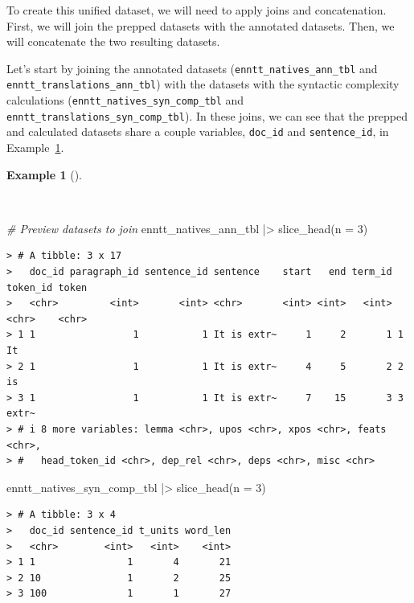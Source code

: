 \documentclass[
  letterpaper,
  DIV=11,
  numbers=noendperiod]{scrreprt}
\newenvironment{Shaded}{\begin{snugshade}}{\end{snugshade}}
\newcommand{\AttributeTok}[1]{\textcolor[rgb]{0.00,0.00,0.00}{#1}}
\newcommand{\CommentTok}[1]{\textcolor[rgb]{0.00,0.00,0.00}{\textit{#1}}}
\newcommand{\DecValTok}[1]{\textcolor[rgb]{0.00,0.00,0.00}{#1}}
\newcommand{\FunctionTok}[1]{\textcolor[rgb]{0.00,0.00,0.00}{#1}}
\newcommand{\NormalTok}[1]{\textcolor[rgb]{0.00,0.00,0.00}{#1}}
\newcommand{\SpecialCharTok}[1]{\textcolor[rgb]{0.00,0.00,0.00}{#1}}
\theoremstyle{definition}
\newtheorem{example}{Example}[chapter]
\theoremstyle{remark}
\begin{document}
To create this unified dataset, we will need to apply joins and
concatenation. First, we will join the prepped datasets with the
annotated datasets. Then, we will concatenate the two resulting
datasets.

Let's start by joining the annotated datasets
(\texttt{enntt\_natives\_ann\_tbl} and
\texttt{enntt\_translations\_ann\_tbl}) with the datasets with the
syntactic complexity calculations
(\texttt{enntt\_natives\_syn\_comp\_tbl} and
\texttt{enntt\_translations\_syn\_comp\_tbl}). In these joins, we can
see that the prepped and calculated datasets share a couple variables,
\texttt{doc\_id} and \texttt{sentence\_id}, in
Example~\ref{exm-td-merging-join-prepped-syn-comp}.

\begin{example}[]\protect\hypertarget{exm-td-merging-join-prepped-syn-comp}{}\label{exm-td-merging-join-prepped-syn-comp}

~

\begin{Shaded}
\begin{Highlighting}[]
\CommentTok{\# Preview datasets to join}
\NormalTok{enntt\_natives\_ann\_tbl }\SpecialCharTok{|\textgreater{}}
  \FunctionTok{slice\_head}\NormalTok{(}\AttributeTok{n =} \DecValTok{3}\NormalTok{)}
\end{Highlighting}
\end{Shaded}

\begin{verbatim}
> # A tibble: 3 x 17
>   doc_id paragraph_id sentence_id sentence    start   end term_id token_id token
>   <chr>         <int>       <int> <chr>       <int> <int>   <int> <chr>    <chr>
> 1 1                 1           1 It is extr~     1     2       1 1        It   
> 2 1                 1           1 It is extr~     4     5       2 2        is   
> 3 1                 1           1 It is extr~     7    15       3 3        extr~
> # i 8 more variables: lemma <chr>, upos <chr>, xpos <chr>, feats <chr>,
> #   head_token_id <chr>, dep_rel <chr>, deps <chr>, misc <chr>
\end{verbatim}

\begin{Shaded}
\begin{Highlighting}[]
\NormalTok{enntt\_natives\_syn\_comp\_tbl }\SpecialCharTok{|\textgreater{}}
  \FunctionTok{slice\_head}\NormalTok{(}\AttributeTok{n =} \DecValTok{3}\NormalTok{)}
\end{Highlighting}
\end{Shaded}

\begin{verbatim}
> # A tibble: 3 x 4
>   doc_id sentence_id t_units word_len
>   <chr>        <int>   <int>    <int>
> 1 1                1       4       21
> 2 10               1       2       25
> 3 100              1       1       27
\end{verbatim}

\end{example}
\end{document}
